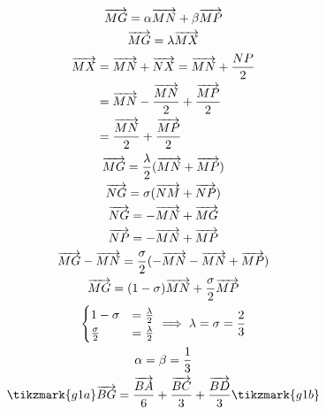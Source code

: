 \documentclass[brazilian, fleqn]{article}
\renewcommand{\vec}[1]{\overrightarrow{#1}}
\begin{document}
\begin{gather}
\begin{aligned}[t]
    \end{aligned} \\
    \vec{MG}=\alpha \vec{MN}+\beta \vec{MP} \\
    \vec{MG}=\lambda \vec{MX} \\
    \begin{aligned}[t]
        \vec{MX}&=\vec{MN}+\vec{NX}=\vec{MN}+\frac{NP}{2}\\
                &=\vec{MN}-\frac{\vec{MN}}{2}+\frac{\vec{MP}}{2} \\
                &=\frac{\vec{MN}}{2}+\frac{\vec{MP}}{2}
    \end{aligned} \\
    \vec{MG}=\frac{\lambda}{2}(\vec{MN}+\vec{MP})\\
    \vec{NG}=\sigma (\vec{NM}+\vec{NP}) \\
    \vec{NG}=-\vec{MN}+\vec{MG}\\
    \vec{NP}=-\vec{MN}+\vec{MP}\\
    \vec{MG}-\vec{MN}=\frac{\sigma}{2}(-\vec{MN}-\vec{MN}+\vec{MP})\\
    \vec{MG}=(1-\sigma)\vec{MN}+\frac{\sigma}{2}\vec{MP} \\
    \begin{cases}
        1-\sigma &= \frac{\lambda}{2}\\
        \frac{\sigma}{2}&=\frac{\lambda}{2}
    \end{cases} \implies
    \lambda = \sigma = \frac{2}{3}\\
    \alpha = \beta = \frac{1}{3} \\
    \tikzmark{g1a} \vec{BG}=\frac{\vec{BA}}{6}+\frac{\vec{BC}}{3}+\frac{\vec{BD}}{3} \tikzmark{g1b}
\end{gather}
\end{document}
